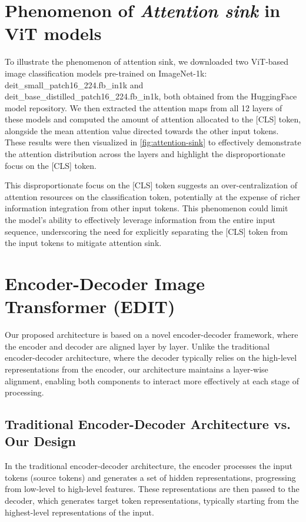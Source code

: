 \section{Phenomenon of \textit{Attention sink} in ViT models}

To illustrate the phenomenon of attention sink, we downloaded two ViT-based image classification models \cite{touvron2021training} pre-trained on ImageNet-1k: deit\_small\_patch16\_224.fb\_in1k and deit\_base\_distilled\_patch16\_224.fb\_in1k, both obtained from the HuggingFace model repository.
We then extracted the attention maps from all 12 layers of these models and computed the amount of attention allocated to the [CLS] token, alongside the mean attention value directed towards the other input tokens. 
These results were then visualized in \cref{fig:attention-sink} to effectively demonstrate the attention distribution across the layers and highlight the disproportionate focus on the [CLS] token.

This disproportionate focus on the [CLS] token suggests an over-centralization of attention resources on the classification token, potentially at the expense of richer information integration from other input tokens.
This phenomenon could limit the model's ability to effectively leverage information from the entire input sequence, underscoring the need for explicitly separating the [CLS] token from the input tokens to mitigate attention sink.


\section{Encoder-Decoder Image Transformer (EDIT)}

Our proposed architecture is based on a novel encoder-decoder framework, where the encoder and decoder are aligned layer by layer.
Unlike the traditional encoder-decoder architecture, where the decoder typically relies on the high-level representations from the encoder, our architecture maintains a layer-wise alignment, enabling both components to interact more effectively at each stage of processing.

\subsection{Traditional Encoder-Decoder Architecture vs. Our Design}
In the traditional encoder-decoder architecture, the encoder processes the input tokens (source tokens) and generates a set of hidden representations, progressing from low-level to high-level features.
These representations are then passed to the decoder, which generates target token representations, typically starting from the highest-level representations of the input.

